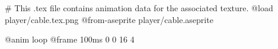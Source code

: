 # This .tex file contains animation data for the associated texture.
@load player/cable.tex.png
@from-aseprite player/cable.aseprite

@anim loop
	@frame 100ms 0 0 16 4
